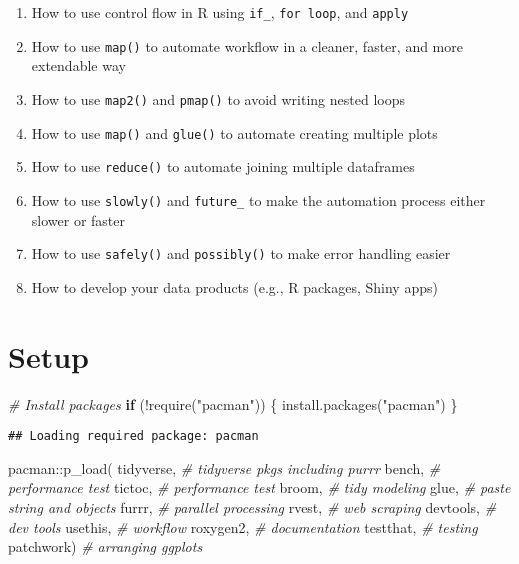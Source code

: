 \documentclass[
]{book}
\newenvironment{Shaded}{\begin{snugshade}}{\end{snugshade}}
\newcommand{\CommentTok}[1]{\textcolor[rgb]{0.56,0.35,0.01}{\textit{#1}}}
\newcommand{\ControlFlowTok}[1]{\textcolor[rgb]{0.13,0.29,0.53}{\textbf{#1}}}
\newcommand{\FunctionTok}[1]{\textcolor[rgb]{0.00,0.00,0.00}{#1}}
\newcommand{\NormalTok}[1]{#1}
\newcommand{\SpecialCharTok}[1]{\textcolor[rgb]{0.00,0.00,0.00}{#1}}
\newcommand{\StringTok}[1]{\textcolor[rgb]{0.31,0.60,0.02}{#1}}
\providecommand{\tightlist}{%
  \setlength{\itemsep}{0pt}\setlength{\parskip}{0pt}}
\begin{document}
\begin{enumerate}
\def\labelenumi{\arabic{enumi}.}
\setcounter{enumi}{-1}
\tightlist
\item
  How to use control flow in R using \texttt{if\_}, \texttt{for\ loop}, and \texttt{apply}
\item
  How to use \texttt{map()} to automate workflow in a cleaner, faster, and more extendable way\\
\item
  How to use \texttt{map2()} and \texttt{pmap()} to avoid writing nested loops
\item
  How to use \texttt{map()} and \texttt{glue()} to automate creating multiple plots
\item
  How to use \texttt{reduce()} to automate joining multiple dataframes
\item
  How to use \texttt{slowly()} and \texttt{future\_} to make the automation process either slower or faster
\item
  How to use \texttt{safely()} and \texttt{possibly()} to make error handling easier
\item
  How to develop your data products (e.g., R packages, Shiny apps)
\end{enumerate}

\hypertarget{setup-3}{%
\section{Setup}\label{setup-3}}

\begin{Shaded}
\begin{Highlighting}[]
\CommentTok{\# Install packages}
\ControlFlowTok{if}\NormalTok{ (}\SpecialCharTok{!}\FunctionTok{require}\NormalTok{(}\StringTok{"pacman"}\NormalTok{)) \{}
  \FunctionTok{install.packages}\NormalTok{(}\StringTok{"pacman"}\NormalTok{)}
\NormalTok{\}}
\end{Highlighting}
\end{Shaded}

\begin{verbatim}
## Loading required package: pacman
\end{verbatim}

\begin{Shaded}
\begin{Highlighting}[]
\NormalTok{pacman}\SpecialCharTok{::}\FunctionTok{p\_load}\NormalTok{(}
\NormalTok{  tidyverse, }\CommentTok{\# tidyverse pkgs including purrr}
\NormalTok{  bench, }\CommentTok{\# performance test }
\NormalTok{  tictoc, }\CommentTok{\# performance test}
\NormalTok{  broom, }\CommentTok{\# tidy modeling}
\NormalTok{  glue, }\CommentTok{\# paste string and objects}
\NormalTok{  furrr, }\CommentTok{\# parallel processing}
\NormalTok{  rvest, }\CommentTok{\# web scraping}
\NormalTok{  devtools, }\CommentTok{\# dev tools }
\NormalTok{  usethis, }\CommentTok{\# workflow     }
\NormalTok{  roxygen2, }\CommentTok{\# documentation }
\NormalTok{  testthat, }\CommentTok{\# testing }
\NormalTok{  patchwork) }\CommentTok{\# arranging ggplots }
\end{Highlighting}
\end{Shaded}
\end{document}
